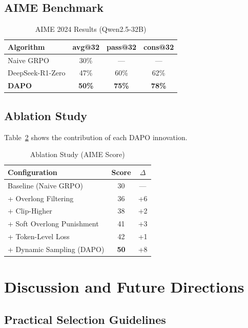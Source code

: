 \documentclass[10pt,twocolumn]{article}
\begin{document}
\subsection{AIME Benchmark}

\begin{table}[ht]
\centering
\caption{AIME 2024 Results (Qwen2.5-32B)}
\label{tab:aime}
\begin{tabular}{lccc}
\toprule
\textbf{Algorithm} & \textbf{avg@32} & \textbf{pass@32} & \textbf{cons@32} \\
\midrule
Naive GRPO & 30\% & --- & --- \\
DeepSeek-R1-Zero & 47\% & 60\% & 62\% \\
\textbf{DAPO} & \textbf{50\%} & \textbf{75\%} & \textbf{78\%} \\
\bottomrule
\end{tabular}
\end{table}

\subsection{Ablation Study}

Table~\ref{tab:ablation} shows the contribution of each DAPO innovation.

\begin{table}[ht]
\centering
\caption{Ablation Study (AIME Score)}
\label{tab:ablation}
\begin{tabular}{lcc}
\toprule
\textbf{Configuration} & \textbf{Score} & \textbf{$\Delta$} \\
\midrule
Baseline (Naive GRPO) & 30 & --- \\
+ Overlong Filtering & 36 & +6 \\
+ Clip-Higher & 38 & +2 \\
+ Soft Overlong Punishment & 41 & +3 \\
+ Token-Level Loss & 42 & +1 \\
+ Dynamic Sampling (DAPO) & \textbf{50} & +8 \\
\bottomrule
\end{tabular}
\end{table}

\section{Discussion and Future Directions}
\label{sec:discuss}

\subsection{Practical Selection Guidelines}
\end{document}
